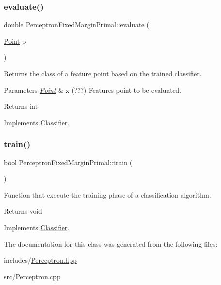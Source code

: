 \subsubsection{\texorpdfstring{evaluate()}{evaluate()}}
{\footnotesize\ttfamily double Perceptron\+Fixed\+Margin\+Primal\+::evaluate (\begin{DoxyParamCaption}\item[{\hyperlink{class_point}{Point}}]{p }\end{DoxyParamCaption})\hspace{0.3cm}{\ttfamily [virtual]}}



Returns the class of a feature point based on the trained classifier. 


\begin{DoxyParams}{Parameters}
{\em \hyperlink{class_point}{Point}} & x (???) Features point to be evaluated. \\
\hline
\end{DoxyParams}
\begin{DoxyReturn}{Returns}
int 
\end{DoxyReturn}


Implements \hyperlink{class_classifier_ae8e9554823b85ddc2dcad2955da811d9}{Classifier}.

\mbox{\label{class_perceptron_fixed_margin_primal_ad41c2a42c4a819c03bf9879110b0f99f}} 
\subsubsection{\texorpdfstring{train()}{train()}}
{\footnotesize\ttfamily bool Perceptron\+Fixed\+Margin\+Primal\+::train (\begin{DoxyParamCaption}{ }\end{DoxyParamCaption})\hspace{0.3cm}{\ttfamily [virtual]}}



Function that execute the training phase of a classification algorithm. 

\begin{DoxyReturn}{Returns}
void 
\end{DoxyReturn}


Implements \hyperlink{class_classifier_a2306a5de27555ab093593ac9642bc7d9}{Classifier}.



The documentation for this class was generated from the following files\+:\begin{DoxyCompactItemize}
\item 
includes/\hyperlink{_perceptron_8hpp}{Perceptron.\+hpp}\item 
src/Perceptron.\+cpp\end{DoxyCompactItemize}
